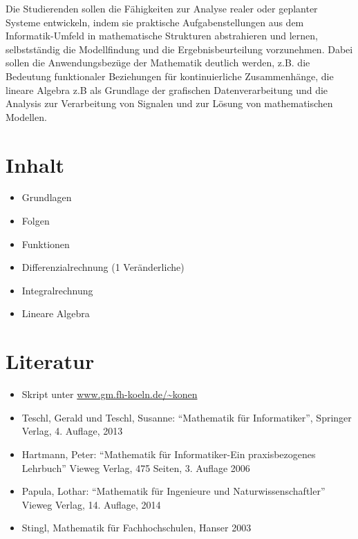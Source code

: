 Die Studierenden sollen die Fähigkeiten zur Analyse realer oder
geplanter Systeme entwickeln, indem sie praktische Aufgabenstellungen
aus dem Informatik-Umfeld in mathematische Strukturen abstrahieren und
lernen, selbstständig die Modellfindung und die Ergebnisbeurteilung
vorzunehmen. Dabei sollen die Anwendungsbezüge der Mathematik deutlich
werden, z.B. die Bedeutung funktionaler Beziehungen für kontinuierliche
Zusammenhänge, die lineare Algebra z.B als Grundlage der grafischen
Datenverarbeitung und die Analysis zur Verarbeitung von Signalen und zur
Lösung von mathematischen Modellen.

\hypertarget{inhaltpathlabel....srcmodulbeschreibungen-bachelor-bpo5ba_mathematik1}{%
\section*{Inhalt\label{../../src/modulbeschreibungen-bachelor-bpo5/BA_Mathematik1}}\label{inhaltpathlabel....srcmodulbeschreibungen-bachelor-bpo5ba_mathematik1}}

\begin{itemize}
\tightlist
\item
  Grundlagen
\item
  Folgen
\item
  Funktionen
\item
  Differenzialrechnung (1 Veränderliche)
\item
  Integralrechnung
\item
  Lineare Algebra
\end{itemize}

\hypertarget{literaturpathlabel....srcmodulbeschreibungen-bachelor-bpo5ba_mathematik1}{%
\section*{Literatur\label{../../src/modulbeschreibungen-bachelor-bpo5/BA_Mathematik1}}\label{literaturpathlabel....srcmodulbeschreibungen-bachelor-bpo5ba_mathematik1}}

\begin{itemize}
\tightlist
\item
  Skript unter
  \href{http://www.gm.fh-koeln.de/~konen}{www.gm.fh-koeln.de/\textasciitilde konen}
\item
  Teschl, Gerald und Teschl, Susanne: ``Mathematik für Informatiker'',
  Springer Verlag, 4. Auflage, 2013
\item
  Hartmann, Peter: ``Mathematik für Informatiker-Ein praxisbezogenes
  Lehrbuch'' Vieweg Verlag, 475 Seiten, 3. Auflage 2006
\item
  Papula, Lothar: ``Mathematik für Ingenieure und Naturwissenschaftler''
  Vieweg Verlag, 14. Auflage, 2014
\item
  Stingl, Mathematik für Fachhochschulen, Hanser 2003
\end{itemize}


